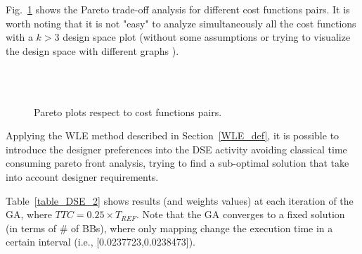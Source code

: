 % 
Fig.~\ref{fig5} shows the Pareto trade-off analysis for different cost functions pairs. It is worth noting that it is not "easy" to analyze simultaneously all the cost functions with a $k > 3$ design space plot (without some assumptions or trying to visualize the design space with different graphs \cite{pareto_nd}). \par
%
\begin{figure}[htbp]
    \centering
    \label{5a} 
    \label{5b} \\
    \label{5c}  
     \label{5d} \\
    \label{5e}  
    \label{5f} 
  \caption{Pareto plots respect to cost functions pairs.} 
  \label{fig5} 
\end{figure}
%
%
%
Applying the WLE method described in Section~\ref{WLE_def}, it is possible to introduce the designer preferences into the DSE activity avoiding classical time consuming pareto front analysis, trying to find a sub-optimal solution that take into account designer requirements. \par
Table~\ref{table_DSE_2} shows results (and weights values) at each iteration of the GA, where $TTC = 0.25 \times T_{REF}$. Note that the GA converges to a fixed solution (in terms of \# of BBs), where only mapping change the execution time in a certain interval (i.e., [0.0237723,0.0238473]). \par
%
